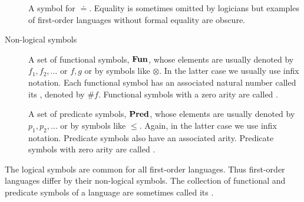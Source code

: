 \begin{definition}
\begin{description}
\begin{thmenum}[series=def:first_order_language]
       A symbol for  \( \doteq \). Equality is sometimes omitted by logicians but examples of first-order languages without formal equality are obscure.
    \end{thmenum}

    \item[Non-logical symbols]
    \hfill
    \begin{thmenum}[resume=def:first_order_language]
       A set of functional symbols, \( \operatorname{\mathbf{Fun}} \), whose elements are usually denoted by \( f_1, f_2, \ldots \) or \( f, g \) or by symbols like \( \otimes \). In the latter case we usually use infix notation. Each functional symbol has an associated natural number called its , denoted by \( \# f \). Functional symbols with a zero arity are called .

       A set of predicate symbols, \( \operatorname{\mathbf{Pred}} \), whose elements are usually denoted by \( p_1, p_2, \ldots \) or by symbols like \( \leq \). Again, in the latter case we use infix notation. Predicate symbols also have an associated arity. Predicate symbols with zero arity are called .
    \end{thmenum}
  \end{description}

  The logical symbols are common for all first-order languages. Thus first-order languages differ by their non-logical symbols. The collection of functional and predicate symbols of a language are sometimes called its .
\end{definition}

